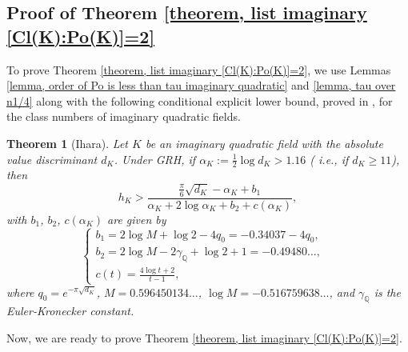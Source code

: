 \documentclass[12pt]{amsart}
\newtheorem{theorem}{Theorem}[section]
\theoremstyle{definition}
\numberwithin{equation}{section}
\begin{document}
\subsection{Proof of Theorem \ref{theorem, list imaginary [Cl(K):Po(K)]=2}} To prove Theorem \ref{theorem, list imaginary [Cl(K):Po(K)]=2}, we use Lemmas \ref{lemma, order of Po is less than tau imaginary quadratic}  and \ref{lemma, tau over n1/4} along with the following  conditional explicit lower bound, proved in \cite[Theorem 5]{Ihara06}, for the class numbers of imaginary quadratic fields. 

\begin{theorem} [{Ihara}] 
	\label{theorem, Ihara's upper bound}
	Let $K$ be an imaginary quadratic field with the absolute value discriminant $d_K$. Under GRH, if $\alpha_K:=\frac{1}{2} \log {d_K} > 1.16$ ( i.e., 
if $d_K \geq 11$), then
	\begin{equation} \label{equation, Ihara's upper bound}
		h_K > \frac{\frac{\pi}{6} \sqrt{{d_K}} -\alpha_K+b_1}{\alpha_K+2\log \alpha_K +b_2+c(\alpha_K)},
	\end{equation}
	with $b_1$, $b_2$, $c(\alpha_K)$ are given by
	\begin{equation*}
		\begin{cases} 
			b_1=2\log M+\log 2-4q_0=-0.34037-4q_0, \\
			b_2=2 \log M-2 \gamma_{\mathbb{Q}}+\log 2+1=-0.49480 \dots, &  \\
			c(t)=\frac{4 \log t+2}{t-1}, &  
		\end{cases}
	\end{equation*}
	where  $q_0=e^{-\pi \sqrt{{d_K}}}$, $M=0.596450134 \dots$, $\log M=-0.516759638 \dots$, and $\gamma_{\mathbb{Q}}$ is the Euler-Kronecker constant.
\end{theorem}


Now, we are ready to prove Theorem \ref{theorem, list imaginary [Cl(K):Po(K)]=2}.
\end{document}
